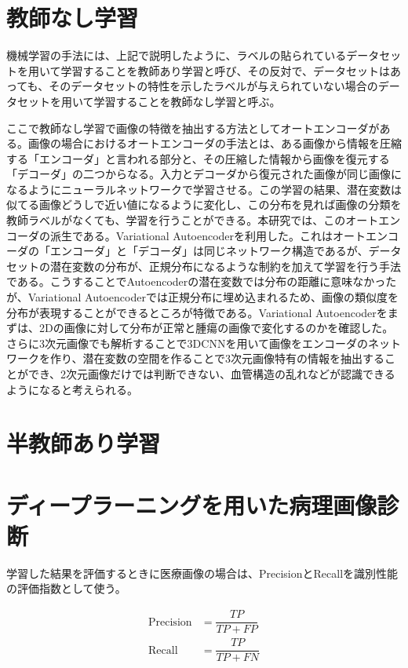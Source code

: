 \section{教師なし学習}
機械学習の手法には、上記で説明したように、ラベルの貼られているデータセットを用いて学習することを教師あり学習と呼び、その反対で、データセットはあっても、そのデータセットの特性を示したラベルが与えられていない場合のデータセットを用いて学習することを教師なし学習と呼ぶ。

ここで教師なし学習で画像の特徴を抽出する方法としてオートエンコーダがある。画像の場合におけるオートエンコーダの手法とは、ある画像から情報を圧縮する「エンコーダ」と言われる部分と、その圧縮した情報から画像を復元する「デコーダ」の二つからなる。入力とデコーダから復元された画像が同じ画像になるようにニューラルネットワークで学習させる。この学習の結果、潜在変数は似てる画像どうしで近い値になるように変化し、この分布を見れば画像の分類を教師ラベルがなくても、学習を行うことができる。本研究では、このオートエンコーダの派生である。Variational Autoencoderを利用した。これはオートエンコーダの「エンコーダ」と「デコーダ」は同じネットワーク構造であるが、データセットの潜在変数の分布が、正規分布になるような制約を加えて学習を行う手法である。こうすることでAutoencoderの潜在変数では分布の距離に意味なかったが、Variational Autoencoderでは正規分布に埋め込まれるため、画像の類似度を分布が表現することができるところが特徴である。Variational Autoencoderをまずは、2Dの画像に対して分布が正常と腫瘍の画像で変化するのかを確認した。さらに3次元画像でも解析することで3DCNNを用いて画像をエンコーダのネットワークを作り、潜在変数の空間を作ることで3次元画像特有の情報を抽出することができ、2次元画像だけでは判断できない、血管構造の乱れなどが認識できるようになると考えられる。

\section{半教師あり学習}

\section{ディープラーニングを用いた病理画像診断}
学習した結果を評価するときに医療画像の場合は、PrecisionとRecallを識別性能の評価指数として使う。

\begin{align}
  \mathrm{Precision} & = \dfrac{TP}{TP+FP}\\
  \mathrm{Recall} & = \dfrac{TP}{TP+FN}
\end{align}

